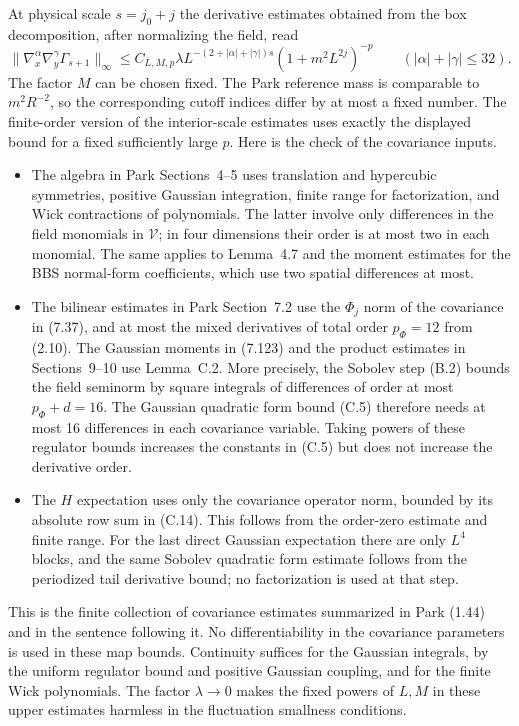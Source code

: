 \documentclass[11pt]{article}
\begin{document}
At physical scale \(s=j_0+j\) the derivative estimates obtained
from the box decomposition, after normalizing the field, read
\[
 \|\nabla_x^\alpha\nabla_y^\gamma\Gamma_{s+1}\|_\infty
 \le C_{L,M,p}\lambda L^{-(2+|\alpha|+|\gamma|)s}
                   (1+m^2L^{2j})^{-p}
 \qquad (|\alpha|+|\gamma|\le 32).
\]
The factor \(M\) can be chosen fixed. The Park reference mass
is comparable to \(m^2 R^{-2}\), so the corresponding cutoff
indices differ by at most a fixed number. The finite-order version
of the interior-scale estimates uses exactly the displayed bound
for a fixed sufficiently large \(p\). Here is the check of the
covariance inputs.
\begin{itemize}
\item The algebra in Park Sections~4--5 uses translation and
hypercubic symmetries, positive Gaussian integration, finite
range for factorization, and Wick contractions of polynomials.
The latter involve only differences in the field monomials
in \(\mathcal V\); in four dimensions their order is at most
two in each monomial. The same applies to Lemma~4.7 and the
moment estimates for the BBS normal-form coefficients, which
use two spatial differences at most.
\item The bilinear estimates in Park Section~7.2 use the
\(\Phi_j\) norm of the covariance in (7.37), and at most
the mixed derivatives of total order \(p_\Phi=12\) from
(2.10). The Gaussian moments in (7.123) and the product
estimates in Sections~9--10 use Lemma~C.2. More precisely,
the Sobolev step (B.2) bounds the field seminorm by square
integrals of differences of order at most \(p_\Phi+d=16\).
The Gaussian quadratic form bound (C.5) therefore needs
at most 16 differences in each covariance variable.
Taking powers of these regulator bounds increases the
constants in (C.5) but does not increase the derivative order.
\item The \(H\) expectation uses only the covariance operator
norm, bounded by its absolute row sum in (C.14). This follows
from the order-zero estimate and finite range. For the last
direct Gaussian expectation there are only \(L^4\) blocks,
and the same Sobolev quadratic form estimate follows from
the periodized tail derivative bound; no factorization is
used at that step.
\end{itemize}
This is the finite collection of covariance estimates summarized
in Park (1.44) and in the sentence following it. No
differentiability in the covariance parameters is used in
these map bounds. Continuity suffices for the Gaussian
integrals, by the uniform regulator bound and positive
Gaussian coupling, and for the finite Wick polynomials.
The factor \(\lambda\to0\) makes the fixed powers of \(L,M\)
in these upper estimates harmless in the fluctuation
smallness conditions.
\end{document}
